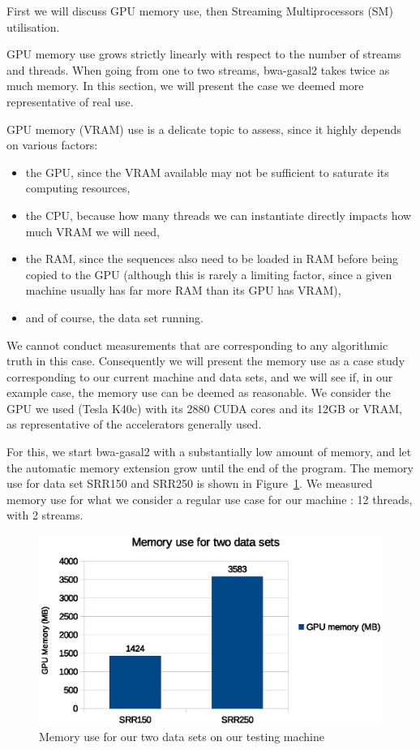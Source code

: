 First we will discuss GPU memory use, then Streaming Multiprocessors (SM) utilisation. 

GPU memory use grows strictly linearly with respect to the number of streams and threads. When going from one to two streams, bwa-gasal2 takes twice as much memory. In this section, we will present the case we deemed more representative of real use.

GPU memory (VRAM) use is a delicate topic to assess, since it highly depends on various factors:

\begin{itemize}
	\item the GPU, since the VRAM available may not be sufficient to saturate its computing resources,
	\item the CPU, because how many threads we can instantiate directly impacts how much VRAM we will need,
	\item the RAM, since the sequences also need to be loaded in RAM before being copied to the GPU (although this is rarely a limiting factor, since a given machine usually has far more RAM than its GPU has VRAM),
	\item and of course, the data set running.
\end{itemize}

We cannot conduct measurements that are corresponding to any algorithmic truth in this case. Consequently we will present the memory use as a case study corresponding to our current machine and data sets, and we will see if, in our example case, the memory use can be deemed as reasonable. We consider the GPU we used (Tesla K40c) with its 2880 CUDA cores and its 12GB or VRAM, as representative of the accelerators generally used.

For this, we start bwa-gasal2 with a substantially low amount of memory, and let the automatic memory extension grow until the end of the program. The memory use for data set SRR150 and SRR250 is shown in Figure~\ref{fig:memory-use}. We measured memory use for what we consider a regular use case for our machine : 12 threads, with 2 streams. 

\begin{figure}[h]
	\centering
	\includegraphics[width=0.9\linewidth]{memory-use}
	\caption{Memory use for our two data sets on our testing machine}
	\label{fig:memory-use}
\end{figure}

